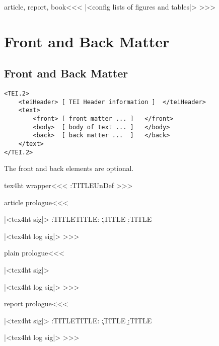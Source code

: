 \<article, report, book\><<<
|<config lists of figures and tables|>
>>>

\chapter{Front and Back Matter}



\section{Front and Back Matter}



\begin{verbatim}
<TEI.2>
    <teiHeader> [ TEI Header information ]  </teiHeader>
    <text>
        <front> [ front matter ... ]   </front>
        <body>  [ body of text ... ]   </body>
        <back>  [ back matter ...  ]   </back>
    </text>
</TEI.2>
\end{verbatim}

The front and back elements are optional.

\<tex4ht wrapper\><<<
 {}
\ifx \a:TITLE\:UnDef
\fi
>>>









\<article prologue\><<<
\def\:gobbleM#1->{}
   {|<tex4ht sig|>%
    \a:TITLE\bgroup \:TITLE: \c:TITLE \egroup \b:TITLE 
    \par\ShowPar
   } 
   {\IgnorePar\EndP{}}
|<tex4ht log sig|>
>>>


\<plain prologue\><<<
\def\:gobbleM#1->{}
   {|<tex4ht sig|>%
    \par\ShowPar} 
   {\IgnorePar\EndP{}}
|<tex4ht log sig|>
>>>



\<report prologue\><<<
\def\:gobbleM#1->{}
   {|<tex4ht sig|>%
    \a:TITLE\bgroup \:TITLE: \c:TITLE \egroup \b:TITLE 
    \par\ShowPar}
   {\IgnorePar\EndP{}}
|<tex4ht log sig|>
>>>



